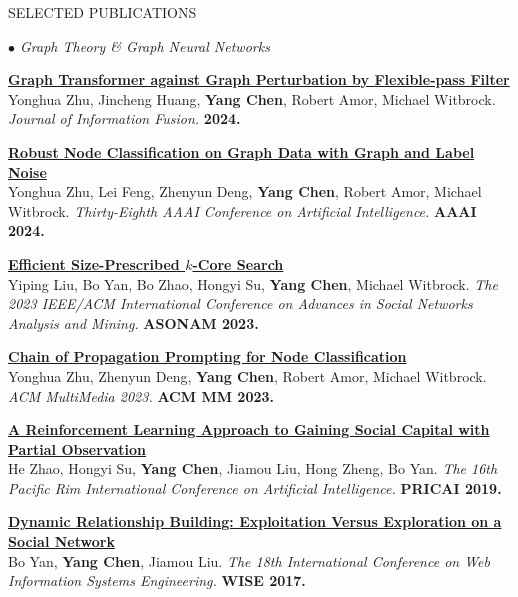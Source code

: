 \documentclass{resume} %
\begin{document}
\begin{rSection}{SELECTED PUBLICATIONS}
\begin{rSubsection}{\large\em $\bullet$ Graph Theory \& Graph Neural Networks}{}{}{}
	\item {\href{https://www.sciencedirect.com/science/article/pii/S1566253524000745}{\bf Graph Transformer against Graph Perturbation by Flexible-pass Filter}}\\
		Yonghua Zhu, Jincheng Huang, \textbf{Yang Chen}, Robert Amor, Michael Witbrock. {\em Journal of Information Fusion.} {\bf 2024.}\\
	\item {\href{https://ojs.aaai.org/index.php/AAAI/article/view/29668}{\bf Robust Node Classification on Graph Data with Graph and Label Noise}}\\
		Yonghua Zhu, Lei Feng, Zhenyun Deng, \textbf{Yang Chen}, Robert Amor, Michael Witbrock. {\em Thirty-Eighth AAAI Conference on Artificial Intelligence.} \textbf{AAAI 2024.}\\
	\item {\href{https://arxiv.org/abs/2403.09214}{\bf Efficient Size-Prescribed $k$-Core Search}}\\
		Yiping Liu, Bo Yan, Bo Zhao, Hongyi Su, \textbf{Yang Chen}, Michael Witbrock. {\em The 2023 IEEE/ACM International Conference on Advances in Social Networks Analysis and Mining.} \textbf{ASONAM 2023.}\\
	\item{
	\href{https://dl.acm.org/doi/10.1145/3581783.3612431}{\bf Chain of Propagation Prompting for Node Classification}}\\
	Yonghua Zhu, Zhenyun Deng, \textbf{Yang Chen}, Robert Amor, Michael Witbrock. {\em ACM MultiMedia 2023.} \textbf{ACM MM 2023.}\\
	\item {\href{https://link.springer.com/chapter/10.1007/978-3-030-29908-8_9}{\bf A Reinforcement Learning Approach to Gaining Social Capital with Partial Observation}}\\
		He Zhao, Hongyi Su, \textbf{Yang Chen}, Jiamou Liu, Hong Zheng, Bo Yan. {\em The 16th Pacific Rim International Conference on Artificial Intelligence.} \textbf{PRICAI 2019.} \\
	\item {\href{https://github.com/PolynomialTime/WISE2017/blob/master/WISE2017.pdf}{\bf Dynamic Relationship Building: Exploitation Versus Exploration on a Social Network}}\\
		Bo Yan, \textbf{Yang Chen}, Jiamou Liu. {\em The 18th International Conference on Web Information Systems Engineering.} \textbf{WISE 2017.}\\

\end{rSubsection}
\end{rSection}
\end{document}
